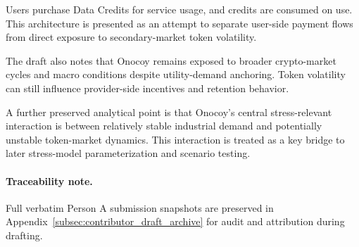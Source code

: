 Users purchase Data Credits for service usage, and credits are consumed on use. This architecture is presented as an attempt to separate user-side payment flows from direct exposure to secondary-market token volatility.

The draft also notes that Onocoy remains exposed to broader crypto-market cycles and macro conditions despite utility-demand anchoring. Token volatility can still influence provider-side incentives and retention behavior.

A further preserved analytical point is that Onocoy's central stress-relevant interaction is between relatively stable industrial demand and potentially unstable token-market dynamics. This interaction is treated as a key bridge to later stress-model parameterization and scenario testing.

\paragraph{Traceability note.} Full verbatim Person A submission snapshots are preserved in Appendix~\ref{subsec:contributor_draft_archive} for audit and attribution during drafting.
